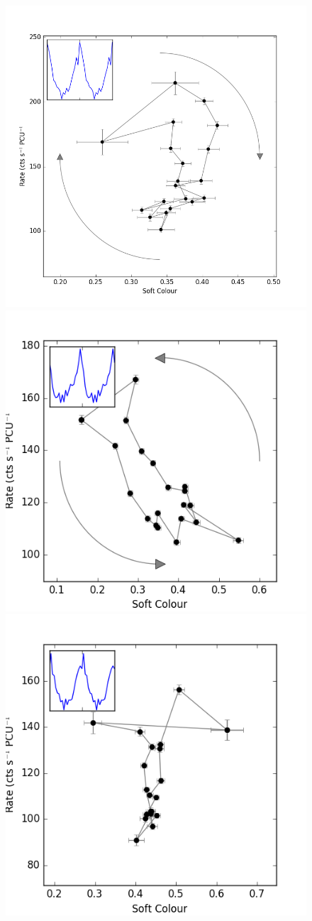 \begin{figure}
    \includegraphics[width=\columnwidth, trim = 0mm 0mm 0mm 0mm]{images/Lloop2.png}\\
    \includegraphics[width=0.5\columnwidth, trim = 0mm 0mm 0mm 0mm]{images/Lloop.png}\includegraphics[width=0.5\columnwidth, trim = 0mm 0mm 0mm 0mm]{images/Lloop4.png}

\end{figure}

